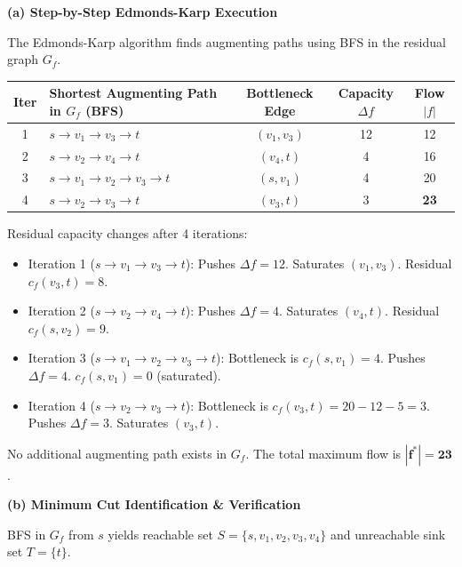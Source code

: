 \documentclass[11pt, a4paper]{article}
\newcommand{\solsection}[1]{\vspace{2pt}\noindent\textbf{\textcolor{primary}{#1}}\par\vspace{1pt}}
\begin{document}
\begin{solutionbox}
  \solsection{(a) Step-by-Step Edmonds-Karp Execution}
  The Edmonds-Karp algorithm finds augmenting paths using BFS in the residual graph $G_f$.

  \begin{center}
    \vspace{2pt}
    \sffamily\small
    \begin{tabularx}{\textwidth}{c X c c c}
      \toprule
      \textbf{Iter} & \textbf{Shortest Augmenting Path in $G_f$ (BFS)} & \textbf{Bottleneck Edge} & \textbf{Capacity $\Delta f$} & \textbf{Flow $|f|$} \\
      \midrule
      1 & $s \to v_1 \to v_3 \to t$ & $(v_1, v_3)$ & 12 & 12 \\
      2 & $s \to v_2 \to v_4 \to t$ & $(v_4, t)$ & 4 & 16 \\
      3 & $s \to v_1 \to v_2 \to v_3 \to t$ & $(s, v_1)$ & 4 & 20 \\
      4 & $s \to v_2 \to v_3 \to t$ & $(v_3, t)$ & 3 & \textbf{23} \\
      \bottomrule
    \end{tabularx}
  \end{center}

  Residual capacity changes after 4 iterations:
  \begin{itemize}[leftmargin=1.4em, itemsep=0.5pt]
    \item Iteration 1 ($s \to v_1 \to v_3 \to t$): Pushes $\Delta f = 12$. Saturates $(v_1, v_3)$. Residual $c_f(v_3, t) = 8$.
    \item Iteration 2 ($s \to v_2 \to v_4 \to t$): Pushes $\Delta f = 4$. Saturates $(v_4, t)$. Residual $c_f(s, v_2) = 9$.
    \item Iteration 3 ($s \to v_1 \to v_2 \to v_3 \to t$): Bottleneck is $c_f(s,v_1)=4$. Pushes $\Delta f = 4$. $c_f(s,v_1)=0$ (saturated).
    \item Iteration 4 ($s \to v_2 \to v_3 \to t$): Bottleneck is $c_f(v_3,t) = 20 - 12 - 5 = 3$. Pushes $\Delta f = 3$. Saturates $(v_3, t)$.
  \end{itemize}
  No additional augmenting path exists in $G_f$. The total maximum flow is $\mathbf{|f^*| = 23}$.

  \solsection{(b) Minimum Cut Identification \& Verification}
  BFS in $G_f$ from $s$ yields reachable set $S = \{s, v_1, v_2, v_3, v_4\}$ and unreachable sink set $T = \{t\}$.


\end{solutionbox}
\end{document}
